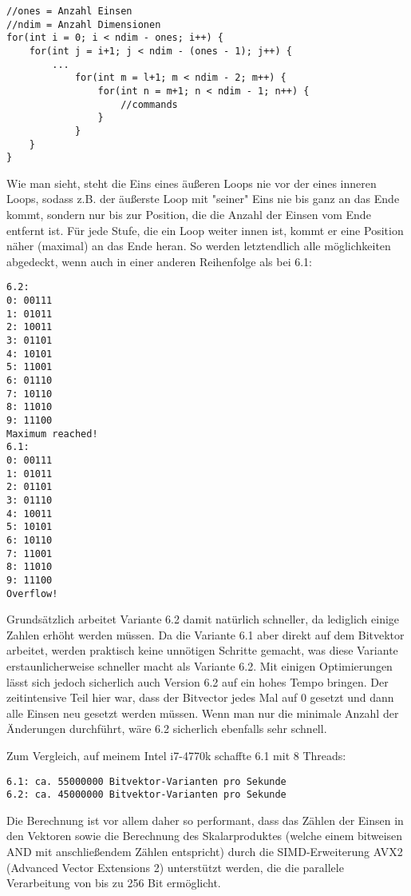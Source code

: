 \documentclass{article}
\begin{document}
\begin{lstlisting}[frame=single]
//ones = Anzahl Einsen
//ndim = Anzahl Dimensionen
for(int i = 0; i < ndim - ones; i++) {
    for(int j = i+1; j < ndim - (ones - 1); j++) {
        ...
            for(int m = l+1; m < ndim - 2; m++) {
                for(int n = m+1; n < ndim - 1; n++) {
                    //commands
                }
            }
    }
}
\end{lstlisting}

Wie man sieht, steht die Eins eines äußeren Loops nie vor der eines inneren Loops, sodass z.B. der äußerste Loop mit "seiner" Eins nie bis ganz an das Ende kommt, sondern nur bis zur Position, die die Anzahl der Einsen vom Ende entfernt ist. Für jede Stufe, die ein Loop weiter innen ist, kommt er eine Position näher (maximal) an das Ende heran. So werden letztendlich alle möglichkeiten abgedeckt, wenn auch in einer anderen Reihenfolge als bei 6.1:

\begin{lstlisting}[frame=single]
6.2: 
0: 00111
1: 01011
2: 10011
3: 01101
4: 10101
5: 11001
6: 01110
7: 10110
8: 11010
9: 11100
Maximum reached!
6.1:
0: 00111
1: 01011
2: 01101
3: 01110
4: 10011
5: 10101
6: 10110
7: 11001
8: 11010
9: 11100
Overflow!
\end{lstlisting}

Grundsätzlich arbeitet Variante 6.2 damit natürlich schneller, da lediglich einige Zahlen erhöht werden müssen. Da die Variante 6.1 aber direkt auf dem Bitvektor arbeitet, werden praktisch keine unnötigen Schritte gemacht, was diese Variante erstaunlicherweise schneller macht als Variante 6.2. Mit einigen Optimierungen lässt sich jedoch sicherlich auch Version 6.2 auf ein hohes Tempo bringen. Der zeitintensive Teil hier war, dass der Bitvector jedes Mal auf 0 gesetzt und dann alle Einsen neu gesetzt werden müssen. Wenn man nur die minimale Anzahl der Änderungen durchführt, wäre 6.2 sicherlich ebenfalls sehr schnell.

Zum Vergleich, auf meinem Intel i7-4770k schaffte 6.1 mit 8 Threads:
\begin{lstlisting}[frame=single]
6.1: ca. 55000000 Bitvektor-Varianten pro Sekunde
6.2: ca. 45000000 Bitvektor-Varianten pro Sekunde
\end{lstlisting}

Die Berechnung ist vor allem daher so performant, dass das Zählen der Einsen in den Vektoren sowie die Berechnung des Skalarproduktes (welche einem bitweisen AND mit anschließendem Zählen entspricht) durch die SIMD-Erweiterung AVX2 (Advanced Vector Extensions 2) unterstützt werden, die die parallele Verarbeitung von bis zu 256 Bit ermöglicht.
\end{document}
